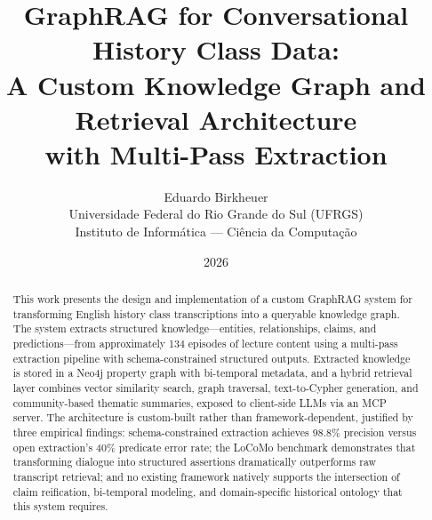 \documentclass[12pt,a4paper]{article}
\title{
    \textbf{GraphRAG for Conversational History Class Data:}\\
    \large A Custom Knowledge Graph and Retrieval Architecture\\with Multi-Pass Extraction
}
\author{Eduardo Birkheuer\\
    \small Universidade Federal do Rio Grande do Sul (UFRGS)\\
    \small Instituto de Inform\'{a}tica --- Ci\^{e}ncia da Computa\c{c}\~{a}o
}
\date{2026}
\begin{document}
\maketitle

\begin{abstract}
This work presents the design and implementation of a custom GraphRAG system for transforming English history class transcriptions into a queryable knowledge graph. The system extracts structured knowledge---entities, relationships, claims, and predictions---from approximately 134 episodes of lecture content using a multi-pass extraction pipeline with schema-constrained structured outputs. Extracted knowledge is stored in a Neo4j property graph with bi-temporal metadata, and a hybrid retrieval layer combines vector similarity search, graph traversal, text-to-Cypher generation, and community-based thematic summaries, exposed to client-side LLMs via an MCP server. The architecture is custom-built rather than framework-dependent, justified by three empirical findings: schema-constrained extraction achieves 98.8\% precision versus open extraction's 40\% predicate error rate; the LoCoMo benchmark demonstrates that transforming dialogue into structured assertions dramatically outperforms raw transcript retrieval; and no existing framework natively supports the intersection of claim reification, bi-temporal modeling, and domain-specific historical ontology that this system requires.
\end{abstract}

\tableofcontents
\newpage







\end{document}
